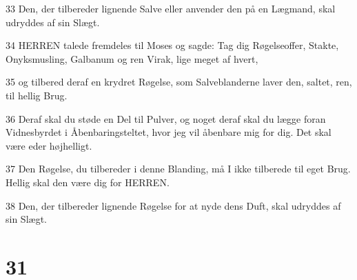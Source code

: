 \par 33 Den, der tilbereder lignende Salve eller anvender den på en Lægmand, skal udryddes af sin Slægt.
\par 34 HERREN talede fremdeles til Moses og sagde: Tag dig Røgelseoffer, Stakte, Onyksmusling, Galbanum og ren Virak, lige meget af hvert,
\par 35 og tilbered deraf en krydret Røgelse, som Salveblanderne laver den, saltet, ren, til hellig Brug.
\par 36 Deraf skal du støde en Del til Pulver, og noget deraf skal du lægge foran Vidnesbyrdet i Åbenbaringsteltet, hvor jeg vil åbenbare mig for dig. Det skal være eder højhelligt.
\par 37 Den Røgelse, du tilbereder i denne Blanding, må I ikke tilberede til eget Brug. Hellig skal den være dig for HERREN.
\par 38 Den, der tilbereder lignende Røgelse for at nyde dens Duft, skal udryddes af sin Slægt.

\chapter{31}

